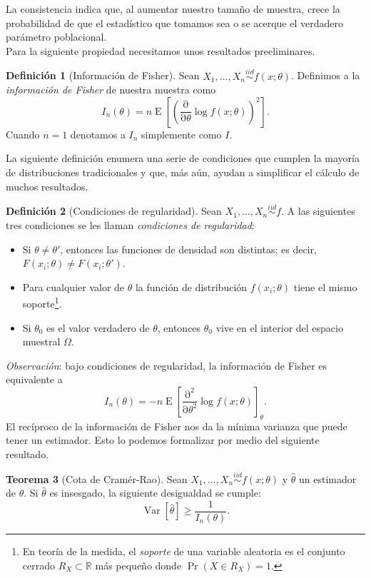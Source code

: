 \documentclass[11pt,letterpaper]{article}
\newcommand{\pderivative}[2]{\ensuremath{\frac{\mathrm{\partial}#2}{\mathrm{\partial}#1}}}
\newcommand{\expected}{\ensuremath{\operatorname{E}}}
\newcommand{\variance}{\ensuremath{\operatorname{Var}}}
\theoremstyle{definition}
\newtheorem{definition}{Definición}[section]
\theoremstyle{theorem}
\newtheorem{theorem}[definition]{Teorema}
\theoremstyle{remark}
\begin{document}
	La consistencia indica que, al aumentar nuestro tamaño de muestra, crece la probabilidad de que el estadístico que tomamos sea o se acerque el verdadero parámetro poblacional. \\
	Para la siguiente propiedad necesitamos unos resultados preeliminares.
	\begin{definition}[Información de Fisher] \label{defFisher}
		Sean \(X_1,\dots,X_n\overset{iid}{\sim}f(x;\theta)\). Definimos a la \textit{información de Fisher} de nuestra muestra como
		\[I_n(\theta)=n\expected\left[\left(\pderivative{\theta}{}\log f(x;\theta)\right)^2\right].\]
		Cuando \(n=1\) denotamos a \(I_n\) simplemente como \(I\).
	\end{definition}
	La siguiente definición enumera una serie de condiciones que cumplen la mayoría de distribuciones tradicionales y que, más aún, ayudan a simplificar el cálculo de muchos resultados.
	\begin{definition}[Condiciones de regularidad]
		Sean \(X_1,\dots,X_n\overset{iid}{\sim}f\). A las siguientes tres condiciones se les llaman \textit{condiciones de regularidad}:
		\begin{itemize}
			\item Si \(\theta\neq\theta'\), entonces las funciones de densidad son distintas; es decir, \(F(x_i;\theta)\neq F(x_i;\theta')\).
			\item Para cualquier valor de \(\theta\) la función de distribución \(f(x_i;\theta)\) tiene el mismo soporte\footnote{En teoría de la medida, el \textit{soporte} de una variable aleatoria es el conjunto cerrado \(R_X\subset\mathbb{R}\) más pequeño donde \(\Pr(X\in R_X)=1\).}.
			\item Si \(\theta_0\) es el valor verdadero de \(\theta\), entonces \(\theta_0\) vive en el interior del espacio muestral \(\Omega\).
		\end{itemize}
	\end{definition}
	\noindent\textit{Observación}: bajo condiciones de regularidad, la información de Fisher es equivalente a \[I_n(\theta)=-n\expected\left[\pderivative{\theta^2}{^2}\log f(x;\theta)\right]_{\theta}.\]
	\indent El recíproco de la información de Fisher nos da la mínima varianza que puede tener un estimador. Esto lo podemos formalizar por medio del siguiente resultado.
	\begin{theorem}[Cota de Cramér-Rao] \label{teoremaCota}
		Sean \(X_1,\dots,X_n\overset{iid}{\sim}f(x;\theta)\) y \(\hat{\theta}\) un estimador de \(\theta\). Si \(\hat{\theta}\) es insesgado, la siguiente desigualdad se cumple: \[\variance[\hat{\theta}]\geq\frac{1}{I_n(\theta) }.\]
	\end{theorem}
\end{document}
